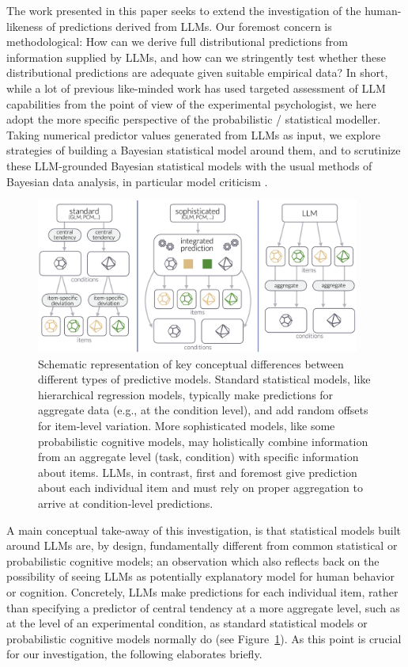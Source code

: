 \documentclass[fleqn]{article}
\begin{document}
The work presented in this paper seeks to extend the investigation of the human-likeness of predictions derived from LLMs.
Our foremost concern is methodological: How can we derive full distributional predictions from information supplied by LLMs, and how can we stringently test whether these distributional predictions are adequate given suitable empirical data?
In short, while a lot of previous like-minded work has used targeted assessment of LLM capabilities from the point of view of the experimental psychologist, we here adopt the more specific perspective of the probabilistic / statistical modeller.
Taking numerical predictor values generated from LLMs as input, we explore strategies of building a Bayesian statistical model around them, and to scrutinize these LLM-grounded Bayesian statistical models with the usual methods of Bayesian data analysis, in particular model criticism \citep{GelmanCarlin2014:Bayesian-Data-A}.

\begin{figure}[t]
  \centering
  \includegraphics[width = 0.95\textwidth]{00-pics/condition-item-level-prediction.png}
  \caption{
    Schematic representation of key conceptual differences between different types of predictive models.
    Standard statistical models, like hierarchical regression models, typically make predictions for aggregate data (e.g., at the condition level), and add random offsets for item-level variation.
    More sophisticated models, like some probabilistic cognitive models, may holistically combine information from an aggregate level (task, condition) with specific information about items.
    LLMs, in contrast, first and foremost give prediction about each individual item and must rely on proper aggregation to arrive at condition-level predictions.
  }
  \label{fig:stats-model-types}
\end{figure}

A main conceptual take-away of this investigation, is that statistical models built around LLMs are, by design, fundamentally different from common statistical or probabilistic cognitive models; an observation which also reflects back on the possibility of seeing LLMs as potentially explanatory model for human behavior or cognition.
Concretely, LLMs make predictions for each individual item, rather than specifying a predictor of central tendency at a more aggregate level, such as at the level of an experimental condition, as standard statistical models or probabilistic cognitive models normally do (see Figure~\ref{fig:stats-model-types}).
As this point is crucial for our investigation, the following elaborates briefly.
\end{document}
